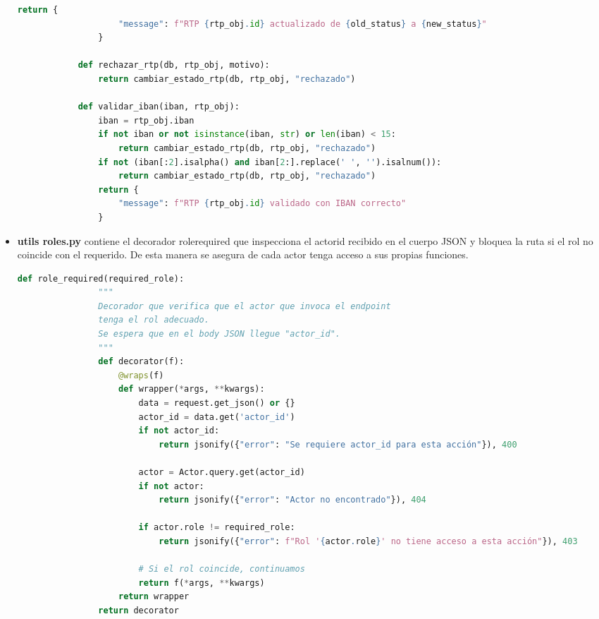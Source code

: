 \begin{itemize}
\begin{lstlisting}[language=Python, style=custom]
                return {
                    "message": f"RTP {rtp_obj.id} actualizado de {old_status} a {new_status}"
                }

            def rechazar_rtp(db, rtp_obj, motivo):
                return cambiar_estado_rtp(db, rtp_obj, "rechazado")

            def validar_iban(iban, rtp_obj):
                iban = rtp_obj.iban
                if not iban or not isinstance(iban, str) or len(iban) < 15:
                    return cambiar_estado_rtp(db, rtp_obj, "rechazado")
                if not (iban[:2].isalpha() and iban[2:].replace(' ', '').isalnum()):
                    return cambiar_estado_rtp(db, rtp_obj, "rechazado")
                return {
                    "message": f"RTP {rtp_obj.id} validado con IBAN correcto"
                }

            \end{lstlisting}

    \item \textbf{utils roles.py} contiene el decorador rolerequired que inspecciona el actorid recibido en el cuerpo JSON y bloquea la ruta si el rol no coincide con el requerido.
            De esta manera se asegura de cada actor tenga acceso a sus propias funciones.

            \begin{lstlisting}[language=Python, style=custom]
                def role_required(required_role):
                """
                Decorador que verifica que el actor que invoca el endpoint
                tenga el rol adecuado.
                Se espera que en el body JSON llegue "actor_id".
                """
                def decorator(f):
                    @wraps(f)
                    def wrapper(*args, **kwargs):
                        data = request.get_json() or {}
                        actor_id = data.get('actor_id')
                        if not actor_id:
                            return jsonify({"error": "Se requiere actor_id para esta acción"}), 400

                        actor = Actor.query.get(actor_id)
                        if not actor:
                            return jsonify({"error": "Actor no encontrado"}), 404

                        if actor.role != required_role:
                            return jsonify({"error": f"Rol '{actor.role}' no tiene acceso a esta acción"}), 403

                        # Si el rol coincide, continuamos
                        return f(*args, **kwargs)
                    return wrapper
                return decorator


\end{lstlisting}
\end{itemize}
